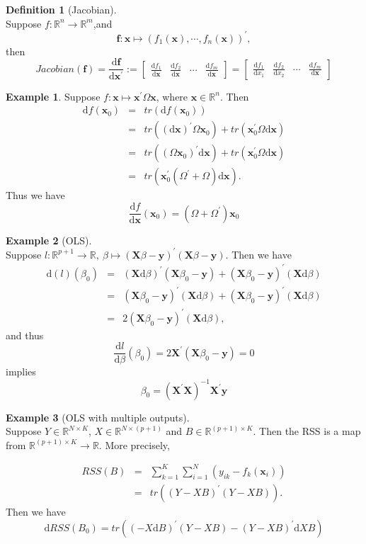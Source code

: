 \documentclass[12pt]{article}
\theoremstyle{definition}
\newtheorem{definition}{Definition}[section]
\newtheorem{example}{Example}[section]
\newcommand{\x}{\mathbf{x}}
\newcommand{\R}{\mathbb{R}}
\newcommand{\X}{\mathbf{X}}
\newcommand{\f}{\mathbf{f}}
\newcommand{\D}{\mathrm{d}}
\begin{document}
\begin{definition}[Jacobian] \ \\
Suppose $f:\R^n \to \R^m$,and 
$$
\f: \x \mapsto (f_1(\x),\cdots,f_n(\x))^\prime,
$$
then
$$
Jacobian(\f) = \frac{\D \f}{\D \x^\prime}:= \begin{bmatrix}
	\frac{\D f_1}{\D \x} & \frac{\D f_2}{\D \x} & \cdots & \frac{\D f_m}{\D \x}\end{bmatrix}=\begin{bmatrix}
	\frac{\D f_1}{\D x_1} & \frac{\D f_2}{\D x_2} & \cdots & \frac{\D f_m}{\D \x}
	\end{bmatrix}
$$
\end{definition}







\begin{example}
Suppose $f: \x \mapsto \x^\prime  \Omega \x$, where $\x \in \R^n$. Then 
\begin{eqnarray*}
	\D f(\x_0) &=& tr(\D f(\x_0)) \\
	&=& tr((\D \x)^\prime\Omega \x_0 )+ tr(\x_0^\prime\Omega \D \x) \\
	&=& tr((\Omega \x_0)^\prime\D \x )+tr(\x_0^\prime\Omega \D \x) \\
	&=& tr(\x_0^\prime(\Omega^\prime+\Omega)\D \x).
\end{eqnarray*}
Thus we have
$$
\frac{\D f}{\D \x}(\x_0) = (\Omega+\Omega^\prime)\x_0
$$
\end{example}


\begin{example}[OLS] \ \\
Suppose $l: \R^{p+1} \to \R, \ \beta \mapsto (\X\beta-\mathbf y)^\prime (\X\beta-\mathbf y)$.
Then we have
\begin{eqnarray*}
	\D(l)(\beta_0) &=& (\X \D \beta)^\prime(\X\beta_0-\mathbf y) + (\X \beta_0-\mathbf y)^\prime(\X \D \beta) \\
	&=& (\X\beta_0-\mathbf y)^\prime (\X \D \beta) + (\X \beta_0-\mathbf y)^\prime(\X \D \beta) \\
	&=& 2(\X\beta_0-\mathbf y)^\prime (\X \D \beta),
\end{eqnarray*}
and thus 
$$
\frac{\D l}{\D \beta}(\beta_0) =2\X^\prime(\X \beta_0-\mathbf y)=0
$$
implies 
$$
\beta_0= (\X^\prime \X)^{-1}\X^\prime \mathbf y
$$
\end{example}

\begin{example}[OLS with multiple outputs] \ \\
Suppose $Y \in \R^{N \times K}$, $X \in \R^{N \times (p+1)}$ and $B \in \R^{(p+1)\times K}$. Then the RSS is a map from $\R^{(p+1) \times K} \to \R$. More precisely, 

\begin{eqnarray*}
	RSS(B) &=& \sum_{k=1}^K \sum_{i=1}^{N}(y_{ik}-f_k(\x_i)) \\
	&=& tr((Y-XB)^\prime(Y-XB)).
\end{eqnarray*}
Then we have
$$
\D RSS (B_0) = tr((-X\D B)^\prime(Y-XB)-(Y-XB)^\prime \D X B )
$$
\end{example}
\end{document}
